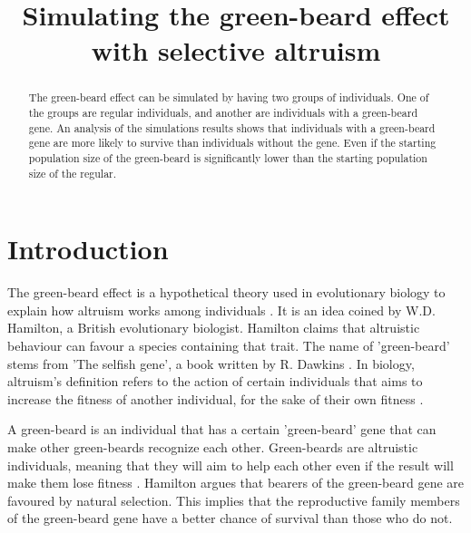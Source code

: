 \documentclass[conference]{IEEEtran}
\begin{document}
	
	\title{Simulating the green-beard effect with selective altruism}
	
	\author{
	}
	
	\maketitle
	
	\begin{abstract}
	The green-beard effect can be simulated by having two groups of individuals. One of the groups are regular individuals, and another are individuals with a green-beard gene. An analysis of the simulations results shows that individuals with a green-beard gene are more likely to survive than individuals without the gene. Even if the starting population size of the green-beard is significantly lower than the starting population size of the regular.
	\end{abstract}
	
	\section{Introduction}
	The green-beard effect is a hypothetical theory used in evolutionary biology to explain how altruism works among individuals \cite{hamilton1964genetical}. It is an idea coined by W.D. Hamilton, a British evolutionary biologist. Hamilton claims that altruistic behaviour can favour a species containing that trait. The name of 'green-beard' stems from 'The selfish gene', a book written by R. Dawkins \cite{dawkins2017selfish}. In biology, altruism's definition refers to the action of certain individuals that aims to increase the fitness of another individual, for the sake of their own fitness \cite{barrett2008natural}. 
	
	A green-beard is an individual that has a certain 'green-beard' gene that can make other green-beards recognize each other. Green-beards are altruistic individuals, meaning that they will aim to help each other even if the result will make them lose fitness \cite{gardner2010greenbeards}. Hamilton argues that bearers of the green-beard gene are favoured by natural selection. This implies that the reproductive family members of the green-beard gene have a better chance of survival than those who do not.
	
\end{document}
